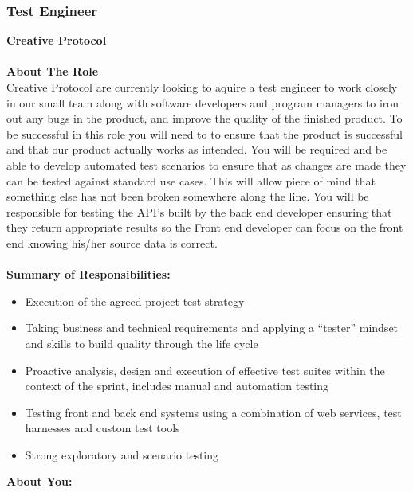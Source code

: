 \documentclass[11pt, oneside, a4paper, titlepage]{article}
\begin{document}
\subsubsection{Test Engineer}
\textbf{Creative Protocol }
\\
\\
\textbf{About The Role}
\\
Creative Protocol are currently looking to aquire a test engineer to work closely in our small team along with software developers and program managers to iron out any bugs in the product, and improve the quality of the finished product. To be successful in this role you will need to to ensure that the product is successful and that our product actually works as intended. You will be required and be able to develop automated test scenarios to ensure that as changes are made they can be tested against standard use cases. This will allow piece of mind that something else has not been broken somewhere along the line. You will be responsible for testing the API's built by the back end developer ensuring that they return appropriate results so the Front end developer can focus on the front end knowing his/her source data is correct. 
\\
\\
\textbf{Summary of Responsibilities:}
\begin{itemize}
    	\item Execution of the agreed project test strategy 
    	\item Taking business and technical requirements and applying a “tester” mindset and skills to build quality through the life cycle 
    	\item Proactive analysis, design and execution of effective test suites within the context of the sprint, includes manual and automation testing 
    	\item Testing front and back end systems using a combination of web services, test harnesses and custom test tools 
    	\item Strong exploratory and scenario testing 
\end{itemize}
\hfill \break
\textbf{About You:}
\end{document}
